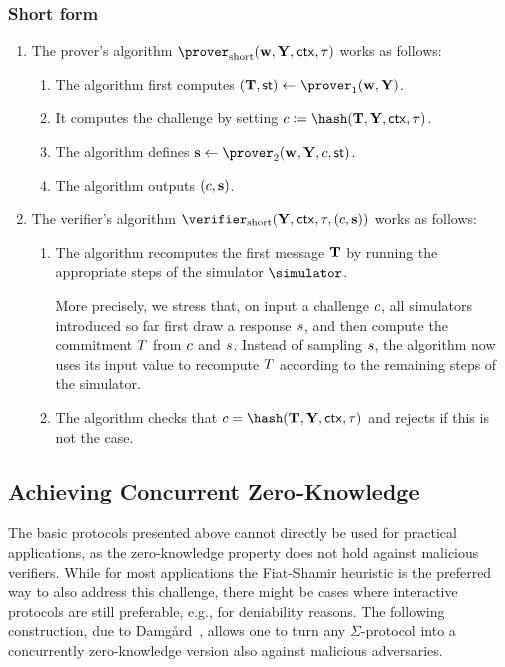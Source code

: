 \documentclass[runningheads]{llncs}
\begin{document}
\subsubsection{Short form}
\begin{enumerate}
  \item
    The prover's algorithm $\shortprover(\vec \witness, \vec \statement,\ctx, \stag)$ works as follows:
    \begin{enumerate}
      \item
        The algorithm first computes $(\vec \commitment,\st)\gets\prover_1(\vec \witness, \vec \statement)$.
      \item
        It computes the challenge by setting $c\defeq\hash(\vec \commitment, \vec \statement,\ctx, \stag)$.
      \item
        The algorithm defines $\vec \response\gets\prover_2(\vec \witness,\vec \statement, \challenge,\st)$.
      \item
        The algorithm outputs $(c,\mathbf {s})$.
    \end{enumerate}
  \item
    The verifier's algorithm $\shortverifier(\vec \statement, \ctx, \stag, (\challenge, \vec \response))$ works as follows:
    \begin{enumerate}
      \item\label{item:fslong:v:recomputet}
        The algorithm recomputes the first message $\mathbf {T}$ by running the appropriate steps of the simulator $\simulator$.

         More precisely, we stress that, on input a challenge $c$, all simulators introduced so far first draw a response $s$, and then compute the commitment $T$ from $c$ and $s$.
        Instead of sampling $s$, the algorithm now uses its input value to recompute $T$ according to the remaining steps of the simulator.
        \item
        The algorithm checks that $c=\hash(\vec \commitment, \vec \statement, \ctx, \tau)$ and rejects if this is not the case.
    \end{enumerate}
\end{enumerate}




\subsection{Achieving Concurrent Zero-Knowledge}\label{sec:concurrent}
The basic protocols presented above cannot directly be used for practical applications, as the zero-knowledge property does not hold against malicious verifiers.
While for most applications the Fiat-Shamir heuristic is the preferred way to also address this challenge, there might be cases where interactive protocols are still preferable, e.g., for deniability reasons.
The following construction, due to Damg\r{a}rd~\cite{EC:Damgard00}, allows one to turn any $\Sigma$-protocol into a concurrently zero-knowledge version also against malicious adversaries.
\end{document}

